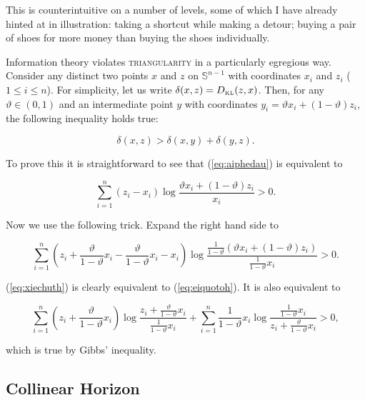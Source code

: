 \documentclass[11pt]{article}
\begin{document}
This is counterintuitive on a number of levels, some of which I have
already hinted at in illustration: taking a shortcut while making a
detour; buying a pair of shoes for more money than buying the shoes
individually.

Information theory violates \textsc{triangularity} in a particularly
egregious way. Consider any distinct two points $x$ and $z$ on
$\mathbb{S}^{n-1}$ with coordinates $x_{i}$ and $z_{i}$
($1\leq{}i\leq{}n$). For simplicity, let us write
$\delta(x,z)=D_{\mbox{\tiny KL}}(z,x)$. Then, for any
$\vartheta\in{}(0,1)$ and an intermediate point $y$ with coordinates
$y_{i}=\vartheta{}x_{i}+(1-\vartheta)z_{i}$, the following inequality
holds true:

\begin{equation}
  \label{eq:aiphedau}
  \delta(x,z)>\delta\left(x,y\right)+\delta\left(y,z\right).
\end{equation}

To prove this it is straightforward to see that (\ref{eq:aiphedau}) is
equivalent to

\begin{equation}
  \label{eq:eiquotoh}
  \sum_{i=1}^{n}(z_{i}-x_{i})\log\frac{\vartheta{}x_{i}+(1-\vartheta)z_{i}}{x_{i}}>0.
\end{equation}

Now we use the following trick. Expand the right hand side to

\begin{equation}
  \label{eq:xiechuth}
  \sum_{i=1}^{n}\left(z_{i}+\frac{\vartheta}{1-\vartheta}x_{i}-\frac{\vartheta}{1-\vartheta}x_{i}-x_{i}\right)\log\frac{\frac{1}{1-\vartheta}\left(\vartheta{}x_{i}+(1-\vartheta)z_{i}\right)}{\frac{1}{1-\vartheta}x_{i}}>0.
\end{equation}

(\ref{eq:xiechuth}) is clearly equivalent to (\ref{eq:eiquotoh}). It
is also equivalent to

\begin{equation}
  \label{eq:ohrohshi}
  \sum_{i=1}^{n}\left(z_{i}+\frac{\vartheta}{1-\vartheta}x_{i}\right)\log\frac{z_{i}+\frac{\vartheta}{1-\vartheta}x_{i}}{\frac{1}{1-\vartheta}x_{i}}+
  \sum_{i=1}^{n}\frac{1}{1-\vartheta}x_{i}\log\frac{\frac{1}{1-\vartheta}x_{i}}{z_{i}+\frac{\vartheta}{1-\vartheta}x_{i}}>0,
\end{equation}

which is true by Gibbs' inequality.

\subsection{Collinear Horizon}
\label{subsec:colhor}
\end{document}
